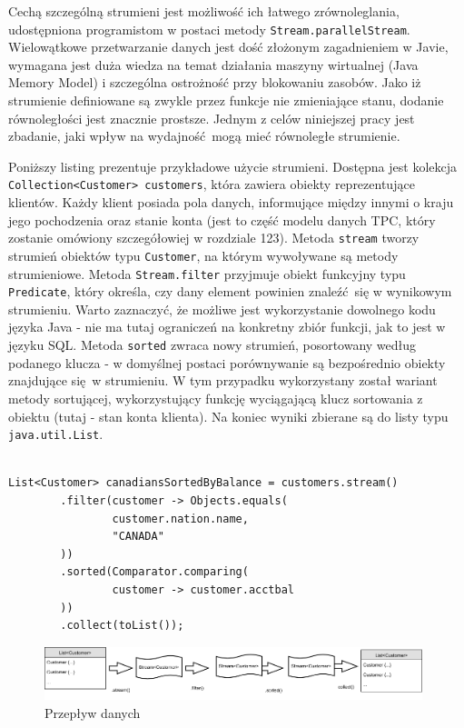 \documentclass[12pt]{extarticle}
\begin{document}
    Cechą szczególną strumieni jest możliwość ich łatwego zrównoleglania, udostępniona programistom w postaci metody \texttt{Stream.parallelStream}. Wielowątkowe przetwarzanie danych jest dość złożonym zagadnieniem w Javie, wymagana jest duża wiedza na temat działania maszyny wirtualnej (Java Memory Model) i szczególna ostrożność przy blokowaniu zasobów. Jako iż strumienie definiowane są zwykle przez funkcje nie zmieniające stanu, dodanie równoległości jest znacznie prostsze. Jednym z celów niniejszej pracy jest zbadanie, jaki wpływ na wydajność mogą mieć równoległe strumienie.

    Poniższy listing prezentuje przykładowe użycie strumieni. Dostępna jest kolekcja \newline \texttt{Collection<Customer> customers}, która zawiera obiekty reprezentujące klientów. Każdy klient posiada pola danych, informujące między innymi o kraju jego pochodzenia oraz stanie konta (jest to część modelu danych TPC, który zostanie omówiony szczegółowiej w rozdziale 123). Metoda \texttt{stream} tworzy strumień obiektów typu \texttt{Customer}, na którym wywoływane są metody strumieniowe. Metoda \texttt{Stream.filter} przyjmuje obiekt funkcyjny typu \texttt{Predicate}, który określa, czy dany element powinien znaleźć się w wynikowym strumieniu. Warto zaznaczyć, że możliwe jest wykorzystanie dowolnego kodu języka Java - nie ma tutaj ograniczeń na konkretny zbiór funkcji, jak to jest w języku SQL. Metoda \texttt{sorted} zwraca nowy strumień, posortowany według podanego klucza - w domyślnej postaci porównywanie są bezpośrednio obiekty znajdujące się w strumieniu. W tym przypadku wykorzystany został wariant metody sortującej, wykorzystujący funkcję wyciągającą klucz sortowania z obiektu (tutaj - stan konta klienta). Na koniec wyniki zbierane są do listy typu \texttt{java.util.List}. 

\begin{lstlisting}[label=streamexample, caption=Przykładowe wykorzystanie Stream API]

List<Customer> canadiansSortedByBalance = customers.stream()
        .filter(customer -> Objects.equals(
                customer.nation.name,
                "CANADA"
        ))
        .sorted(Comparator.comparing(
                customer -> customer.acctbal
        ))
        .collect(toList());

\end{lstlisting}

\begin{figure}[h]
\centering
\includegraphics[width=11cm]{flow.png}
\caption{Przepływ danych}
\label{fig:flow}
\end{figure}
\end{document}
